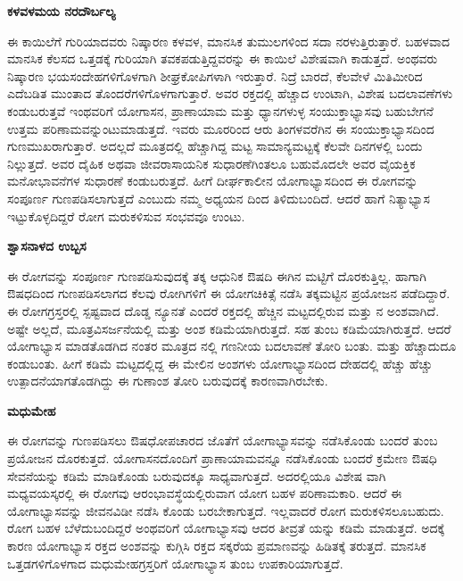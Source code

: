 \textbf{ಕಳವಳಮಯ ನರದೌರ್ಬಲ್ಯ} 

ಈ ಕಾಯಿಲೆಗೆ ಗುರಿಯಾದವರು ನಿಷ್ಕಾರಣ ಕಳವಳ, ಮಾನಸಿಕ ತುಮುಲಗಳಿಂದ ಸದಾ ನರಳುತ್ತಿರುತ್ತಾರೆ. ಬಹಳವಾದ ಮಾನಸಿಕ ಕೆಲಸದ ಒತ್ತಡಕ್ಕೆ ಗುರಿಯಾಗಿ ತವಕಪಡುತ್ತಿದ್ದವರನ್ನು ಈ ಕಾಯಿಲೆ ವಿಶೇಷವಾಗಿ ಕಾಡುತ್ತದೆ. ಅಂಥವರು ನಿಷ್ಕಾರಣ ಭಯಸಂದೇಹಗಳಿಗೊಳಗಾಗಿ ಶೀಘ್ರಕೋಪಿಗಳಾಗಿ ಇರುತ್ತಾರೆ. ನಿದ್ರೆ ಬಾರದೆ, ಕೆಲವೇಳೆ ಮಿತಿಮೀರಿದ ಎದೆಬಡಿತ ಮುಂತಾದ ತೊಂದರೆಗಳಿಗೊಳಗಾಗುತ್ತಾರೆ. ಅವರ ರಕ್ತದಲ್ಲಿ ಹೆಚ್ಚಾದ  ಉಂಟಾಗಿ, ವಿಶೇಷ  ಬದಲಾವಣೆಗಳು ಕಂಡುಬರುತ್ತವೆ ಇಂಥವರಿಗೆ ಯೋಗಾಸನ, ಪ್ರಾಣಾಯಾಮ ಮತ್ತು ಧ್ಯಾನಗಳುಳ್ಳ ಸಂಯುಕ್ತಾಭ್ಯಾಸವು ಬಹುಬೇಗನೆ ಉತ್ತಮ ಪರಿಣಾಮವನ್ನುಂಟುಮಾಡುತ್ತದೆ. ಇವರು ಮೂರರಿಂದ ಆರು ತಿಂಗಳವರೆಗಿನ ಈ ಸಂಯುಕ್ತಾಭ್ಯಾಸದಿಂದ ಗುಣಮುಖರಾಗುತ್ತಾರೆ. ಅದಲ್ಲದೆ ಮೂತ್ರದಲ್ಲಿ ಹೆಚ್ಚಾಗಿದ್ದ  ಮಟ್ಟ ಸಾಮಾನ್ಯಮಟ್ಟಕ್ಕೆ ಕೆಲವೇ ದಿನಗಳಲ್ಲಿ ಬಂದು ನಿಲ್ಲುತ್ತದೆ. ಅವರ ದೈಹಿಕ ಅಥವಾ ಜೀವರಾಸಾಯನಿಕ ಸುಧಾರಣೆಗಿಂತಲೂ ಬಹುಮೊದಲೇ ಅವರ ವೈಯಕ್ತಿಕ ಮನೋಭಾವನೆಗಳ ಸುಧಾರಣೆ ಕಂಡುಬರುತ್ತದೆ. ಹೀಗೆ ದೀರ್ಘಕಾಲೀನ ಯೋಗಾಭ್ಯಾಸದಿಂದ ಈ ರೋಗವನ್ನು ಸಂಪೂರ್ಣ ಗುಣಪಡಿಸಲಾಗುತ್ತದೆ ಎಂಬುದು ನಮ್ಮ ಅಧ್ಯಯನ ದಿಂದ ತಿಳಿದುಬಂದಿದೆ. ಆದರೆ ಹಾಗೆ ನಿತ್ಯಾಭ್ಯಾಸ ಇಟ್ಟುಕೊಳ್ಳದಿದ್ದರೆ ರೋಗ ಮರುಕಳಿಸುವ ಸಂಭವವೂ ಉಂಟು.

\textbf{ಶ್ವಾಸನಾಳದ ಉಬ್ಬಸ }

ಈ ರೋಗವನ್ನು ಸಂಪೂರ್ಣ ಗುಣಪಡಿಸುವುದಕ್ಕೆ ತಕ್ಕ ಆಧುನಿಕ ಔಷದಿ  ಈಗಿನ ಮಟ್ಟಿಗೆ ದೊರಕುತ್ತಿಲ್ಲ. ಹಾಗಾಗಿ ಔಷಧದಿಂದ ಗುಣಪಡಿಸಲಾಗದ ಕೆಲವು ರೋಗಿಗಳಿಗೆ ಈ ಯೋಗಚಿಕಿತ್ಸೆ ನಡೆಸಿ ತಕ್ಕಮಟ್ಟಿನ ಪ್ರಯೋಜನ ಪಡೆದಿದ್ದಾರೆ. ಈ ರೋಗಗ್ರಸ್ತರಲ್ಲಿ ಸ್ಪಷ್ಟವಾದ ದೊಡ್ಡ ನ್ಯೂನತೆ ಎಂದರೆ ರಕ್ತದಲ್ಲಿ ಹೆಚ್ಚಿನ ಮಟ್ಟದಲ್ಲಿರುವ  ಮತ್ತು  ನ ಅಂಶವಾಗಿದೆ. ಅಷ್ಟೇ ಅಲ್ಲದೆ, ಮೂತ್ರವಿಸರ್ಜನೆಯಲ್ಲಿ  ಮತ್ತು  ಅಂಶ ಕಡಿಮೆಯಾಗಿರುತ್ತದೆ.  ಸಹ ತುಂಬ ಕಡಿಮೆಯಾಗಿರುತ್ತದೆ. ಆದರೆ ಯೋಗಾಭ್ಯಾಸ ಮಾಡತೊಡಗಿದ ನಂತರ ಮೂತ್ರದ  ನಲ್ಲಿ ಗಣನೀಯ ಬದಲಾವಣೆ ತೋರಿ ಬಂತು.  ಮತ್ತು  ಹೆಚ್ಚಾದುದೂ ಕಂಡುಬಂತು. ಹೀಗೆ ಕಡಿಮೆ ಮಟ್ಟದಲ್ಲಿದ್ದ ಈ ಮೇಲಿನ ಅಂಶಗಳು ಯೋಗಾಭ್ಯಾಸದಿಂದ ದೇಹದಲ್ಲಿ ಹೆಚ್ಚು ಹೆಚ್ಚು ಉತ್ಪಾದನೆಯಾಗತೊಡಗಿದ್ದು ಈ ಗುಣಾಂಶ ತೋರಿ ಬರುವುದಕ್ಕೆ ಕಾರಣವಾಗಿರಬೇಕು.

\textbf{ಮಧುಮೇಹ  }

ಈ ರೋಗವನ್ನು ಗುಣಪಡಿಸಲು ಔಷಧೋಪಚಾರದ ಜೊತೆಗೆ ಯೋಗಾಭ್ಯಾಸವನ್ನು ನಡೆಸಿಕೊಂಡು ಬಂದರೆ ತುಂಬ ಪ್ರಯೋಜನ ದೊರಕುತ್ತದೆ. ಯೋಗಾಸನದೊಂದಿಗೆ ಪ್ರಾಣಾಯಾಮವನ್ನೂ ನಡೆಸಿಕೊಂಡು ಬಂದರೆ ಕ್ರಮೇಣ ಔಷಧಿ ಸೇವನೆಯನ್ನು ಕಡಿಮೆ ಮಾಡಿಕೊಂಡು ಬರುವುದಕ್ಕೂ ಸಾಧ್ಯವಾಗುತ್ತದೆ. ಅದರಲ್ಲಿಯೂ ವಿಶೇಷ ವಾಗಿ ಮಧ್ಯವಯಸ್ಕರಲ್ಲಿ ಈ ರೋಗವು ಆರಂಭಾವಸ್ಥೆಯಲ್ಲಿರುವಾಗ ಯೋಗ ಬಹಳ ಪರಿಣಾಮಕಾರಿ. ಆದರೆ ಈ ಯೋಗಾಭ್ಯಾಸವನ್ನು ಜೀವನವಿಡೀ ನಡೆಸಿ ಕೊಂಡು ಬರಬೇಕಾಗುತ್ತದೆ. ಇಲ್ಲವಾದರೆ ರೋಗ ಮರುಕಳಿಸಲೂಬಹುದು. ರೋಗ ಬಹಳ ಬೆಳೆದುಬಂದಿದ್ದರೆ ಅಂಥವರಿಗೆ ಯೋಗಾಭ್ಯಾಸವು ಆದರ ತೀವ್ರತೆ ಯನ್ನು ಕಡಿಮೆ ಮಾಡುತ್ತದೆ. ಅದಕ್ಕೆ ಕಾರಣ ಯೋಗಾಭ್ಯಾಸ ರಕ್ತದ  ಅಂಶವನ್ನು ಕುಗ್ಗಿಸಿ ರಕ್ತದ ಸಕ್ಕರೆಯ ಪ್ರಮಾಣವನ್ನು ಹಿಡಿತಕ್ಕೆ ತರುತ್ತದೆ. ಮಾನಸಿಕ ಒತ್ತಡಗಳಿಗೊಳಗಾದ ಮಧುಮೇಹಗ್ರಸ್ತರಿಗೆ ಯೋಗಾಭ್ಯಾಸ ತುಂಬ ಉಪಕಾರಿಯಾಗುತ್ತದೆ.

